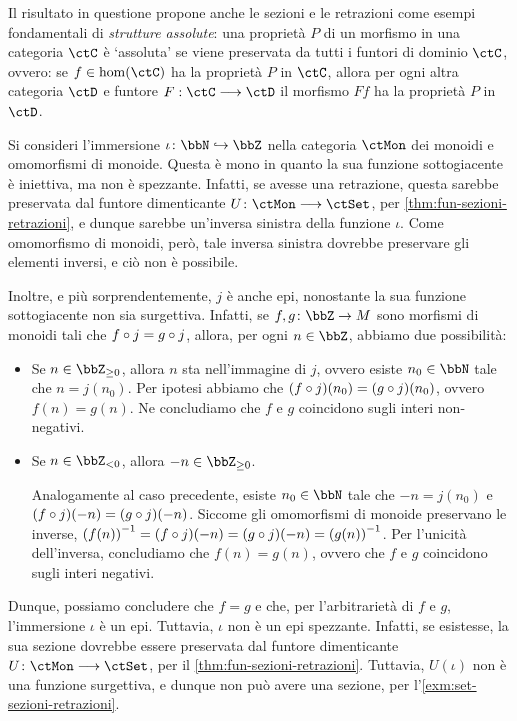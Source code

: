 Il risultato in questione propone anche le sezioni e le retrazioni come esempi fondamentali di \emph{strutture assolute}: una proprietà \(P\) di un morfismo in una categoria \(\ctC\) è `assoluta' se viene preservata da tutti i funtori di dominio \(\ctC\), ovvero: se \(f\in\hom(\ctC)\) ha la proprietà \(P\) in \(\ctC\), allora per ogni altra categoria \(\ctD\) e funtore \(F : \ctC\fun\ctD\) il morfismo \(Ff\) ha la proprietà \(P\) in \(\ctD\).
\begin{example}\label{mono_epi_noniso}
	Si consideri l'immersione \(\iota \colon \bbN \mono \bbZ\)	nella categoria \(\ctMon\) dei monoidi e omomorfismi di monoide.	Questa è mono in quanto la sua funzione sottogiacente è iniettiva,	ma non è spezzante.	Infatti, se avesse una retrazione,	questa sarebbe preservata dal funtore dimenticante \(U \colon \ctMon \fun \ctSet\),	per \ref{thm:fun-sezioni-retrazioni},	e dunque sarebbe un'inversa sinistra della funzione \(\iota\).	Come omomorfismo di monoidi, però, tale inversa sinistra dovrebbe preservare gli elementi inversi,	e ciò non è possibile.

	Inoltre, e più sorprendentemente, \( j\) è anche epi,	nonostante la sua funzione sottogiacente non sia surgettiva.	Infatti, se \(f, g \colon \bbZ \to M\) sono morfismi di monoidi tali che \(f\circ j = g\circ j\),	allora, per ogni \(n \in \bbZ\),	abbiamo due possibilità:
	\begin{itemize}
		\item Se \(n \in \bbZ_{\geq 0}\), allora \(n\) sta nell'immagine di \( j\), ovvero esiste \(n_0 \in \bbN\) tale che \(n =  j(n_0)\). Per ipotesi abbiamo che \((f\circ j) (n_0) = (g\circ j) (n_0)\), ovvero \(f (n) = g (n)\). Ne concludiamo che \(f\) e \(g\) coincidono sugli interi non-negativi.
		\item Se \(n \in \bbZ_{< 0}\), allora \(-n \in \bbZ_{\geq 0}\).

		      Analogamente al caso precedente, esiste \(n_0 \in \bbN\) tale che \(-n =  j(n_0)\) e \((f\circ j) (-n) = (g\circ j) (-n)\). Siccome gli omomorfismi di monoide preservano le inverse, \({(f (n))}^{-1} = (f\circ j) {(-n)} = (g\circ j) (-n) = {(g (n))}^{-1}\). Per l'unicità dell'inversa, concludiamo che \(f (n) = g (n)\), ovvero che \(f\) e \(g\) coincidono sugli interi negativi.
	\end{itemize}
	Dunque, possiamo concludere che \(f = g\) e che, per l'arbitrarietà di \(f\) e \(g\), l'immersione \(\iota\) è un epi. Tuttavia, \(\iota\) non è un epi spezzante. Infatti, se esistesse, la sua sezione dovrebbe essere preservata dal funtore dimenticante \(U \colon \ctMon \fun \ctSet\), per il \autoref{thm:fun-sezioni-retrazioni}. Tuttavia, \(U(\iota)\) non è una funzione surgettiva, e dunque non può avere una sezione, per l'\autoref{exm:set-sezioni-retrazioni}.
\end{example}

